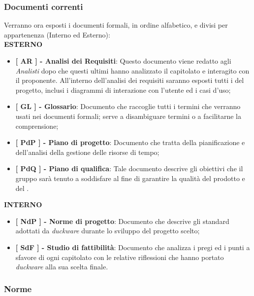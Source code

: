 \subsubsection{Documenti correnti}
Verranno ora esposti i documenti formali, in ordine alfabetico, e divisi per appartenenza (Interno ed Esterno):\\[0.5cm]
\textbf{ESTERNO}
\begin{itemize}
	\item \textbf{[ AR ] - Analisi dei Requisiti}: Questo documento viene redatto agli \emph{Analisti} dopo che questi ultimi hanno analizzato il capitolato e interagito con il proponente. All’interno dell’analisi dei requisiti saranno esposti tutti i  del progetto, inclusi i diagrammi di interazione con l’utente ed i casi d’uso;
	\item \textbf{[ GL ] - Glossario}: Documento che raccoglie tutti i termini che verranno usati nei documenti formali; serve a disambiguare termini o a facilitarne la comprensione;
	\item \textbf{[ PdP ] - Piano di progetto}: Documento che tratta della pianificazione e dell’analisi della gestione delle risorse di tempo;
	\item \textbf{[ PdQ ] - Piano di qualifica}: Tale documento descrive gli obiettivi che il gruppo sarà tenuto a soddisfare al fine di garantire la qualità del prodotto e del .
\end{itemize}
\textbf{INTERNO}
\begin{itemize}
	\item \textbf{[ NdP ] - Norme di progetto}: Documento che descrive gli standard adottati da \emph{duckware} durante lo sviluppo del progetto scelto;
	\item \textbf{[ SdF ] - Studio di fattibilità}: Documento che analizza i pregi ed i punti a sfavore di ogni capitolato con le relative riflessioni che hanno portato \emph{duckware} alla sua scelta finale.

\end{itemize}

\subsubsection{Norme}
